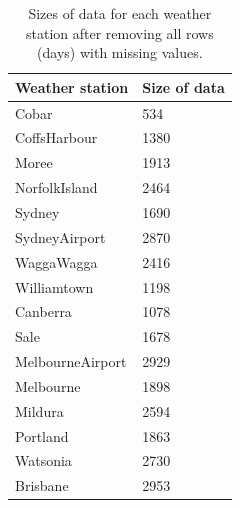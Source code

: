 \documentclass[11pt]{article}
\begin{document}
\begin{table}[H]
    \begin{small}
        \caption{Sizes of data for each weather station after removing all rows (days) with missing values.}
        \label{tab:sizes}
        \begin{center}
            \begin{tabular}{|l|l|}
                \hline
                \textbf{Weather station} & \textbf{Size of data} \\
                \hline
                Cobar                    & 534                   \\
                \hline
                CoffsHarbour             & 1380                  \\
                \hline
                Moree                    & 1913                  \\
                \hline
                NorfolkIsland            & 2464                  \\
                \hline
                Sydney                   & 1690                  \\
                \hline
                SydneyAirport            & 2870                  \\
                \hline
                WaggaWagga               & 2416                  \\
                \hline
                Williamtown              & 1198                  \\
                \hline
                Canberra                 & 1078                  \\
                \hline
                Sale                     & 1678                  \\
                \hline
                MelbourneAirport         & 2929                  \\
                \hline
                Melbourne                & 1898                  \\
                \hline
                Mildura                  & 2594                  \\
                \hline
                Portland                 & 1863                  \\
                \hline
                Watsonia                 & 2730                  \\
                \hline
                Brisbane                 & 2953                  \\

\end{tabular}
\end{center}
\end{small}
\end{table}
\end{document}

